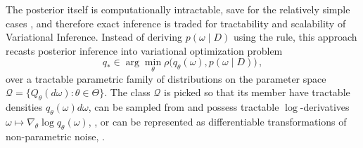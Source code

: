 \documentclass[a4paper,10pt]{article}
\begin{document}
The posterior itself is computationally intractable, save for the relatively simple cases
\cite{citation_needed}, and therefore exact inference is traded for tractability and scalability
of Variational Inference. Instead of deriving $p(\omega \mid D)$ using the rule, this approach
recasts posterior inference into variational optimization problem
\begin{equation} \label{eq:variational-progam}
  q_*
    \in \arg \min_{\theta} \rho\bigl(
      q_\theta(\omega), p(\omega \mid D)
    \bigr)
    \,,
\end{equation}
over a tractable parametric family of distributions on the parameter space $
  \mathcal{Q} = \{Q_\theta(d\omega) \colon \theta \in \Theta\}
$. The class $\mathcal{Q}$ is picked so that its member have tractable densities $
  q_\theta(\omega) d\omega
$, can be sampled from and possess tractable $\log$-derivatives $
  \omega \mapsto \nabla_\theta \log q_\theta(\omega)
$, \cite{williams_simple_1992}, or can be represented as differentiable transformations
of non-parametric noise, \cite{kingma_auto-encoding_2014,figurnov_implicit_2019}.
\end{document}
